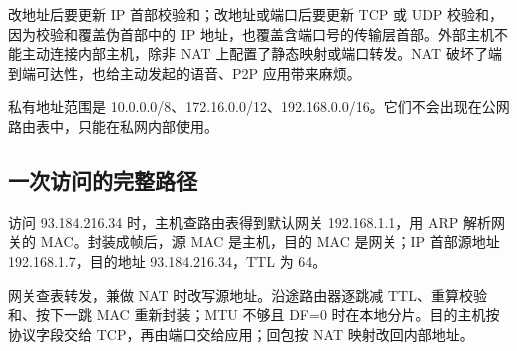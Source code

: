 改地址后要更新 IP 首部校验和；改地址或端口后要更新 TCP 或 UDP 校验和，因为校验和覆盖伪首部中的 IP 地址，也覆盖含端口号的传输层首部。外部主机不能主动连接内部主机，除非 NAT 上配置了静态映射或端口转发。NAT 破坏了端到端可达性，也给主动发起的语音、P2P 应用带来麻烦。

私有地址范围是 10.0.0.0/8、172.16.0.0/12、192.168.0.0/16。它们不会出现在公网路由表中，只能在私网内部使用。

\subsection{一次访问的完整路径}

访问 93.184.216.34 时，主机查路由表得到默认网关 192.168.1.1，用 ARP 解析网关的 MAC。封装成帧后，源 MAC 是主机，目的 MAC 是网关；IP 首部源地址 192.168.1.7，目的地址 93.184.216.34，TTL 为 64。

网关查表转发，兼做 NAT 时改写源地址。沿途路由器逐跳减 TTL、重算校验和、按下一跳 MAC 重新封装；MTU 不够且 DF=0 时在本地分片。目的主机按协议字段交给 TCP，再由端口交给应用；回包按 NAT 映射改回内部地址。

\newpage

